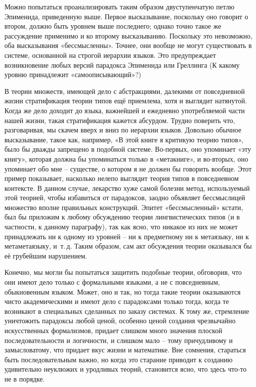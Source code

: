 \documentclass[../main.tex]{subfiles}
\begin{document}
Можно попытаться проанализировать таким образом двуступенчатую петлю Эпименида, приведенную выше. Первое высказывание, поскольку оно говорит о втором, должно быть уровнем выше последнего; однако точно такое же рассуждение применимо и ко второму высказыванию. Поскольку это невозможно, оба высказывания «бессмысленны». Точнее, они вообще не могут существовать в системе, основанной на строгой иерархии языков. Это предупреждает возникновение любых версий парадокса Эпименида или Греллинга (К какому уровню принадлежит «самоописывающий»?)

В теории множеств, имеющей дело с абстракциями, далекими от повседневной жизни стратификация теории типов ещё приемлема, хотя и выглядит натянутой. Когда же дело доходит до языка, важнейшей и ежедневно употребляемой части нашей жизни, такая стратификация кажется абсурдом. Трудно поверить что, разговаривая, мы скачем вверх и вниз по иерархии языков. Довольно обычное высказывание, такое как, например, «В этой книге я критикую теорию типов», было бы дважды запрещено в подобной системе. Во-первых, оно упоминает «эту книгу», которая должна бы упоминаться только в «метакниге», и во-вторых, оно упоминает обо мне \--- существе, о котором я не должен бы говорить вообще. Этот пример показывает, насколько нелепо выглядит теория типов в повседневном контексте. В данном случае, лекарство хуже самой болезни метод, используемый этой теорией, чтобы избавиться от парадоксов, заодно объявляет бессмыслицей множество вполне правильных конструкций. Эпитет «бессмысленный» кстати, был бы приложим к любому обсуждению теории лингвистических типов (и в частности, к данному параграфу), так как ясно, что никакое из них не может принадлежать ни к одному из уровней \--- ни к предметному ни к метаязыку, ни к метаметаязыку, и~т.\,д. Таким образом, сам акт обсуждения теории оказывался бы её грубейшим нарушением.

Конечно, мы могли бы попытаться защитить подобные теории, обговорив, что они имеют дело только с формальными языками, а не с повседневным, обыкновенным языком. Может, оно и так, но тогда такие теории оказываются чисто академическими и имеют дело с парадоксами только тогда, когда те возникают в специальных сделанных по заказу системах. К тому же, стремление уничтожить парадоксы любой ценой, особенно ценой создания чрезвычайно искусственных формализмов, придает слишком много значения плоской последовательности и логичности, и слишком мало \--- тому причудливому и замысловатому, что придает вкус жизни и математике. Вне сомнения, стараться быть последовательным важно, но когда это старание приводит к созданию удивительно неуклюжих и уродливых теорий, становится ясно, что здесь что-то не в порядке.
\end{document}
